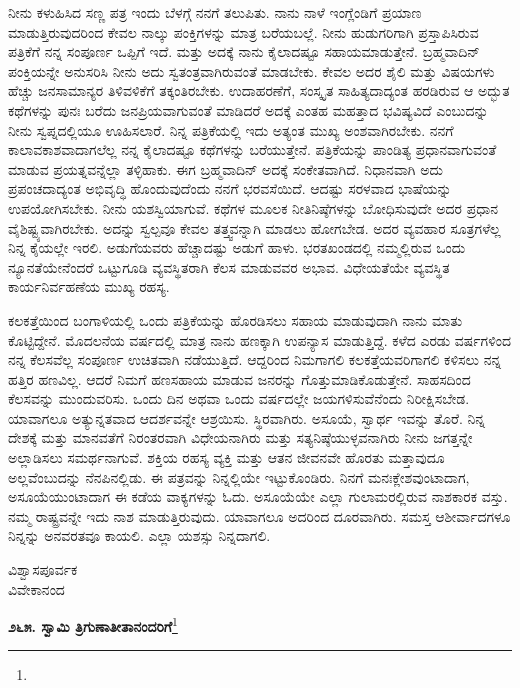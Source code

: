 ನೀನು ಕಳುಹಿಸಿದ ಸಣ್ಣ ಪತ್ರ ಇಂದು ಬೆಳಗ್ಗೆ ನನಗೆ ತಲುಪಿತು. ನಾನು ನಾಳೆ ಇಂಗ್ಲೆಂಡಿಗೆ ಪ್ರಯಾಣ ಮಾಡುತ್ತಿರುವುದರಿಂದ ಕೇವಲ ನಾಲ್ಕು ಪಂಕ್ತಿಗಳನ್ನು ಮಾತ್ರ ಬರೆಯಬಲ್ಲೆ. ನೀನು ಹುಡುಗರಿಗಾಗಿ ಪ್ರಸ್ತಾಪಿಸಿರುವ ಪತ್ರಿಕೆಗೆ ನನ್ನ ಸಂಪೂರ್ಣ ಒಪ್ಪಿಗೆ ಇದೆ. ಮತ್ತು ಅದಕ್ಕೆ ನಾನು ಕೈಲಾದಷ್ಟೂ ಸಹಾಯಮಾಡುತ್ತೇನೆ. ಬ್ರಹ್ಮವಾದಿನ್ ಪಂಕ್ತಿಯನ್ನೇ ಅನುಸರಿಸಿ ನೀನು ಅದು ಸ್ವತಂತ್ರವಾಗಿರುವಂತೆ ಮಾಡಬೇಕು. ಕೇವಲ ಅದರ ಶೈಲಿ ಮತ್ತು ವಿಷಯಗಳು ಹೆಚ್ಚು ಜನಸಾಮಾನ್ಯರ ತಿಳಿವಳಿಕೆಗೆ ತಕ್ಕಂತಿರಬೇಕು. ಉದಾಹರಣೆಗೆ, ಸಂಸ್ಕೃತ ಸಾಹಿತ್ಯದಾದ್ಯಂತ ಹರಡಿರುವ ಆ ಅದ್ಭುತ ಕಥೆಗಳನ್ನು ಪುನಃ ಬರೆದು ಜನಪ್ರಿಯವಾಗುವಂತೆ ಮಾಡಿದರೆ ಅದಕ್ಕೆ ಎಂತಹ ಮಹತ್ತಾದ ಭವಿಷ್ಯವಿದೆ ಎಂಬುದನ್ನು ನೀನು ಸ್ವಪ್ನದಲ್ಲಿಯೂ ಊಹಿಸಲಾರೆ. ನಿನ್ನ ಪತ್ರಿಕೆಯಲ್ಲಿ ಇದು ಅತ್ಯಂತ ಮುಖ್ಯ ಅಂಶವಾಗಿರಬೇಕು. ನನಗೆ ಕಾಲಾವಕಾಶವಾದಾಗಲೆಲ್ಲ ನನ್ನ ಕೈಲಾದಷ್ಟೂ ಕಥೆಗಳನ್ನು ಬರೆಯುತ್ತೇನೆ. ಪತ್ರಿಕೆಯನ್ನು ಪಾಂಡಿತ್ಯ ಪ್ರಧಾನವಾಗುವಂತೆ ಮಾಡುವ ಪ್ರಯತ್ನವನ್ನೆಲ್ಲಾ ತಳ್ಳಿಹಾಕು. ಈಗ ಬ್ರಹ್ಮವಾದಿನ್ ಅದಕ್ಕೆ ಸಂಕೇತವಾಗಿದೆ. ನಿಧಾನವಾಗಿ ಅದು ಪ್ರಪಂಚದಾದ್ಯಂತ ಅಭಿವೃದ್ಧಿ ಹೊಂದುವುದೆಂದು ನನಗೆ ಭರವಸೆಯಿದೆ. ಆದಷ್ಟು ಸರಳವಾದ ಭಾಷೆಯನ್ನು ಉಪಯೋಗಿಸಬೇಕು. ನೀನು ಯಶಸ್ವಿಯಾಗುವೆ. ಕಥೆಗಳ ಮೂಲಕ ನೀತಿನಿಷ್ಠೆಗಳನ್ನು ಬೋಧಿಸುವುದೇ ಅದರ ಪ್ರಧಾನ ವೈಶಿಷ್ಟ್ಯವಾಗಿರಬೇಕು. ಅದನ್ನು ಸ್ವಲ್ಪವೂ ಕೇವಲ ತತ್ತ್ವವನ್ನಾಗಿ ಮಾಡಲು ಹೋಗಬೇಡ. ಅದರ ವ್ಯವಹಾರ ಸೂತ್ರಗಳೆಲ್ಲ ನಿನ್ನ ಕೈಯಲ್ಲೇ ಇರಲಿ. ಅಡುಗೆಯವರು ಹೆಚ್ಚಾದಷ್ಟು ಅಡುಗೆ ಹಾಳು. ಭರತಖಂಡದಲ್ಲಿ ನಮ್ಮಲ್ಲಿರುವ ಒಂದು ನ್ಯೂನತೆಯೇನೆಂದರೆ ಒಟ್ಟುಗೂಡಿ ವ್ಯವಸ್ಥಿತರಾಗಿ ಕೆಲಸ ಮಾಡುವವರ ಅಭಾವ. ವಿಧೇಯತೆಯೇ ವ್ಯವಸ್ಥಿತ ಕಾರ್ಯನಿರ್ವಹಣೆಯ ಮುಖ್ಯ ರಹಸ್ಯ.

ಕಲಕತ್ತೆಯಿಂದ ಬಂಗಾಳಿಯಲ್ಲಿ ಒಂದು ಪತ್ರಿಕೆಯನ್ನು ಹೊರಡಿಸಲು ಸಹಾಯ ಮಾಡುವುದಾಗಿ ನಾನು ಮಾತು ಕೊಟ್ಟಿದ್ದೇನೆ. ಮೊದಲನೆಯ ವರ್ಷದಲ್ಲಿ ಮಾತ್ರ ನಾನು ಹಣಕ್ಕಾಗಿ ಉಪನ್ಯಾಸ ಮಾಡುತ್ತಿದ್ದೆ. ಕಳೆದ ಎರಡು ವರ್ಷಗಳಿಂದ ನನ್ನ ಕೆಲಸವೆಲ್ಲ ಸಂಪೂರ್ಣ ಉಚಿತವಾಗಿ ನಡೆಯುತ್ತಿದೆ. ಆದ್ದರಿಂದ ನಿಮಗಾಗಲಿ ಕಲಕತ್ತೆಯವರಿಗಾಗಲಿ ಕಳಿಸಲು ನನ್ನ ಹತ್ತಿರ ಹಣವಿಲ್ಲ. ಆದರೆ ನಿಮಗೆ ಹಣಸಹಾಯ ಮಾಡುವ ಜನರನ್ನು ಗೊತ್ತುಮಾಡಿಕೊಡುತ್ತೇನೆ. ಸಾಹಸದಿಂದ ಕೆಲಸವನ್ನು ಮುಂದುವರಿಸು. ಒಂದು ದಿನ ಅಥವಾ ಒಂದು ವರ್ಷದಲ್ಲೇ ಜಯಗಳಿಸುವೆನೆಂದು ನಿರೀಕ್ಷಿಸಬೇಡ. ಯಾವಾಗಲೂ ಅತ್ಯುನ್ನತವಾದ ಆದರ್ಶವನ್ನೇ ಆಶ್ರಯಿಸು. ಸ್ಥಿರವಾಗಿರು. ಅಸೂಯೆ, ಸ್ವಾರ್ಥ ಇವನ್ನು ತೊರೆ. ನಿನ್ನ ದೇಶಕ್ಕೆ ಮತ್ತು ಮಾನವತೆಗೆ ನಿರಂತರವಾಗಿ ವಿಧೇಯನಾಗಿರು ಮತ್ತು ಸತ್ಯನಿಷ್ಠೆಯುಳ್ಳವನಾಗಿರು\enginline{-} ನೀನು ಜಗತ್ತನ್ನೇ ಅಲ್ಲಾಡಿಸಲು ಸಮರ್ಥನಾಗುವೆ. ಶಕ್ತಿಯ ರಹಸ್ಯ ವ್ಯಕ್ತಿ ಮತ್ತು ಆತನ ಜೀವನವೇ ಹೊರತು ಮತ್ತಾವುದೂ ಅಲ್ಲವೆಂಬುದನ್ನು ನೆನಪಿನಲ್ಲಿಡು. ಈ ಪತ್ರವನ್ನು ನಿನ್ನಲ್ಲಿಯೇ ಇಟ್ಟುಕೊಂಡಿರು. ನಿನಗೆ ಮನಃಕ್ಲೇಶವುಂಟಾದಾಗ, ಅಸೂಯೆಯುಂಟಾದಾಗ ಈ ಕಡೆಯ ವಾಕ್ಯಗಳನ್ನು ಓದು. ಅಸೂಯೆಯೇ ಎಲ್ಲಾ ಗುಲಾಮರಲ್ಲಿರುವ ನಾಶಕಾರಕ ವಸ್ತು. ನಮ್ಮ ರಾಷ್ಟ್ರವನ್ನೇ ಇದು ನಾಶ ಮಾಡುತ್ತಿರುವುದು. ಯಾವಾಗಲೂ ಅದರಿಂದ ದೂರವಾಗಿರು. ಸಮಸ್ತ ಆಶೀರ್ವಾದಗಳೂ ನಿನ್ನನ್ನು ಅನವರತವೂ ಕಾಯಲಿ. ಎಲ್ಲಾ ಯಶಸ್ಸು ನಿನ್ನದಾಗಲಿ.

{\flushright
ವಿಶ್ವಾಸಪೂರ್ವಕ\\ವಿವೇಕಾನಂದ\par}

\begin{center}
\textbf{೨೬೫. ಸ್ವಾಮಿ ತ್ರಿಗುಣಾತೀತಾನಂದರಿಗೆ}\footnote{}
\end{center}

